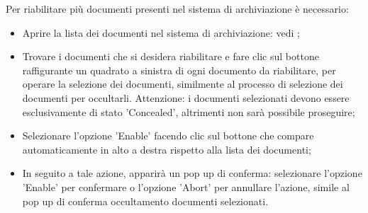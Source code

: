 \documentclass[10pt, a4paper]{article}
\begin{document}
Per riabilitare più documenti presenti nel sistema di archiviazione è necessario:
\begin{itemize}
    \item Aprire la lista dei documenti nel sistema di archiviazione: vedi ;
    \item Trovare i documenti che si desidera riabilitare e fare clic sul bottone raffigurante un quadrato a sinistra di ogni documento da riabilitare, per operare la selezione dei documenti, similmente al processo di selezione dei documenti per occultarli. Attenzione: i documenti selezionati devono essere esclusivamente di stato 'Concealed', altrimenti non sarà possibile proseguire;
    \item Selezionare l'opzione 'Enable' facendo clic sul bottone che compare automaticamente in alto a destra rispetto alla lista dei documenti; 
    \item In seguito a tale azione, apparirà un pop up di conferma: selezionare l'opzione 'Enable' per confermare o l'opzione 'Abort' per annullare l'azione, simile al pop up di conferma occultamento documenti selezionati.
\end{itemize}
\end{document}
